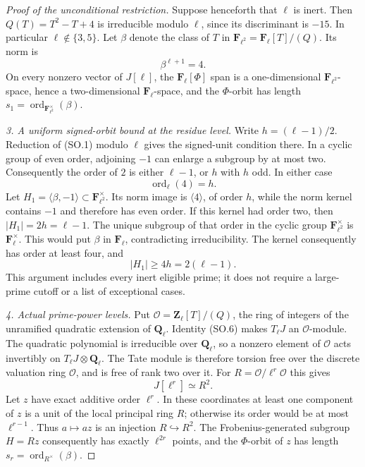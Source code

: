 \documentclass[11pt,a4paper]{article}
\begin{document}
\begin{proof}[Proof of the unconditional restriction]
Suppose henceforth that $\ell$ is inert.  Then
$Q(T)=T^2-T+4$ is irreducible modulo $\ell$, since its
discriminant is $-15$.  In particular $\ell\notin\{3,5\}$.
Let $\beta$ denote the class of $T$ in
$\mathbf F_{\ell^2}=\mathbf F_\ell[T]/(Q)$.  Its norm is
\[
                         \beta^{\ell+1}=4.                \tag{SO.7}
\]
On every nonzero vector of $J[\ell]$, the $\mathbf F_\ell[\Phi]$
span is a one-dimensional $\mathbf F_{\ell^2}$-space, hence a
two-dimensional $\mathbf F_\ell$-space, and the $\Phi$-orbit has
length
$s_1=\operatorname{ord}_{\mathbf F_{\ell^2}^{\times}}(\beta)$.

\emph{3. A uniform signed-orbit bound at the residue level.}
Write $h=(\ell-1)/2$.  Reduction of (SO.1) modulo $\ell$ gives
the signed-unit condition there.  In a cyclic group of even
order, adjoining $-1$ can enlarge a subgroup by at most two.
Consequently the order of $2$ is either $\ell-1$, or $h$ with
$h$ odd.  In either case
\[
                       \operatorname{ord}_\ell(4)=h.       \tag{SO.8}
\]
Let $H_1=\langle\beta,-1\rangle\subset\mathbf F_{\ell^2}^\times$.
Its norm image is $\langle4\rangle$, of order $h$, while the
norm kernel contains $-1$ and therefore has even order.
If this kernel had order two, then $|H_1|=2h=\ell-1$.
The unique subgroup of that order in the cyclic group
$\mathbf F_{\ell^2}^\times$ is $\mathbf F_\ell^\times$.
This would put $\beta$ in $\mathbf F_\ell$, contradicting
irreducibility.  The kernel consequently has order at least
four, and
\[
                          |H_1|\ge4h=2(\ell-1).            \tag{SO.9}
\]
This argument includes every inert eligible prime; it does not
require a large-prime cutoff or a list of exceptional cases.

\emph{4. Actual prime-power levels.}
Put $\mathcal O=\mathbf Z_\ell[T]/(Q)$, the ring of integers
of the unramified quadratic extension of $\mathbf Q_\ell$.
Identity (SO.6) makes $T_\ell J$ an $\mathcal O$-module.
The quadratic polynomial is irreducible over $\mathbf Q_\ell$,
so a nonzero element of $\mathcal O$ acts invertibly on
$T_\ell J\otimes\mathbf Q_\ell$.  The Tate module is therefore
torsion free over the discrete valuation ring $\mathcal O$,
and is free of rank two over it.  For
$R=\mathcal O/\ell^r\mathcal O$ this gives
\[
                              J[\ell^r]\simeq R^2.
\]
Let $z$ have exact additive order $\ell^r$.  In these coordinates
at least one component of $z$ is a unit of the local principal
ring $R$; otherwise its order would be at most $\ell^{r-1}$.
Thus $a\mapsto az$ is an injection $R\hookrightarrow R^2$.
The Frobenius-generated subgroup $H=Rz$ consequently has
exactly $\ell^{2r}$ points, and the $\Phi$-orbit of $z$ has
length $s_r=\operatorname{ord}_{R^\times}(\beta)$.


\end{proof}
\end{document}
